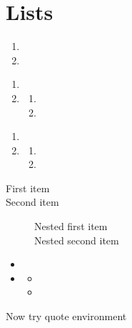 \documentclass[solutionsatend]{ouunit}
\newenvironment{highlight}[1][]{\begin{style2box}[#1]}{\end{style2box}}
\begin{document}
\section{Lists}
\lipsum[133]
\begin{enumerate}
\item
\lipsum[133]
\item
\lipsum[133]
\end{enumerate}
\lipsum[133]
\begin{enumerate}
\item
\lipsum[133]
\item
\lipsum[133]
\begin{enumerate}
\item
\lipsum[133]
\item
\lipsum[133]
\end{enumerate}
\end{enumerate}
\begin{highlight}
\lipsum[133]
\begin{enumerate}
\item
\lipsum[133]
\item
\lipsum[133]
\begin{enumerate}
\item
\lipsum[133]
\item
\lipsum[133]
\end{enumerate}
\end{enumerate}
\end{highlight}
\lipsum[133]
\begin{description}
\item[First item]
\lipsum[133]
\item[Second item]
\lipsum[133]
\begin{description}
\item[Nested first item]
\lipsum[133]
\item[Nested second item]
\lipsum[133]
\end{description}
\end{description}
\lipsum[133]
\begin{itemize}
\item
\lipsum[133]
\item
\lipsum[133]
\begin{itemize}
\item
\lipsum[133]
\item
\lipsum[133]
\end{itemize}
\end{itemize}
\lipsum[133]

Now try quote environment
\begin{quote}
\lipsum[133]
\end{quote}
\end{document}
